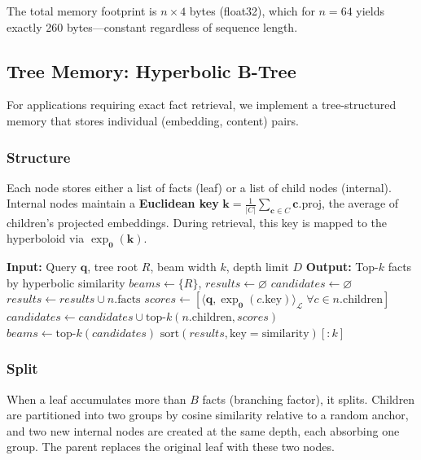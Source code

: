 \documentclass[conference]{IEEEtran}
\begin{document}
The total memory footprint is $n \times 4$ bytes (float32), which for $n = 64$ yields exactly 260 bytes---constant regardless of sequence length.

\subsection{Tree Memory: Hyperbolic B-Tree}

For applications requiring exact fact retrieval, we implement a tree-structured memory that stores individual (embedding, content) pairs.

\subsubsection{Structure}
Each node stores either a list of facts (leaf) or a list of child nodes (internal). Internal nodes maintain a \textbf{Euclidean key} $\mathbf{k} = \frac{1}{|C|}\sum_{\mathbf{c} \in C} \mathbf{c}.\text{proj}$, the average of children's projected embeddings. During retrieval, this key is mapped to the hyperboloid via $\operatorname{exp}_{\mathbf{0}}(\mathbf{k})$.

\begin{algorithm}[t]
\caption{Tree Recall via Beam Search}
\label{alg:recall}
\begin{algorithmic}
\STATE \textbf{Input:} Query $\mathbf{q}$, tree root $R$, beam width $k$, depth limit $D$
\STATE \textbf{Output:} Top-$k$ facts by hyperbolic similarity
\STATE $beams \leftarrow \{R\}$, $results \leftarrow \varnothing$
  \STATE $candidates \leftarrow \varnothing$
      \STATE $results \leftarrow results \cup n.\text{facts}$
    \ELSE
      \STATE $scores \leftarrow [\langle \mathbf{q}, \operatorname{exp}_{\mathbf{0}}(c.\text{key}) \rangle_{\mathcal{L}} \; \forall c \in n.\text{children}]$
      \STATE $candidates \leftarrow candidates \cup \text{top-}k(n.\text{children}, scores)$
    \ENDIF
  \ENDFOR
  \STATE $beams \leftarrow \text{top-}k(candidates)$
\ENDFOR
\RETURN $\text{sort}(results, \text{key}=\text{similarity})[:k]$
\end{algorithmic}
\end{algorithm}

\subsubsection{Split}
When a leaf accumulates more than $B$ facts (branching factor), it splits. Children are partitioned into two groups by cosine similarity relative to a random anchor, and two new internal nodes are created at the same depth, each absorbing one group. The parent replaces the original leaf with these two nodes.
\end{document}
